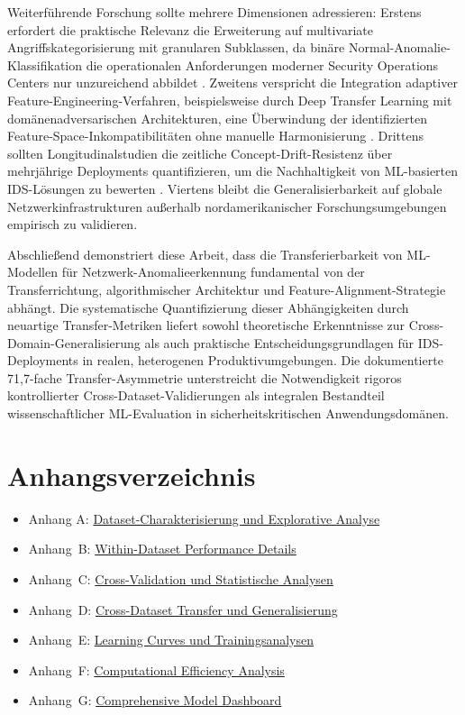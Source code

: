 \documentclass[11pt,a4paper]{article}
\newcommand{\addtoTOC}[1]{\addcontentsline{toc}{section}{#1}}
\begin{document}
    Weiterführende Forschung sollte mehrere Dimensionen adressieren: Erstens erfordert die praktische Relevanz die Erweiterung auf multivariate Angriffskategorisierung mit granularen Subklassen, da binäre Normal-Anomalie-Klassifikation die operationalen Anforderungen moderner Security Operations Centers nur unzureichend abbildet \parencite{Vinayakumar2019}. Zweitens verspricht die Integration adaptiver Feature-Engineering-Verfahren, beispielsweise durch Deep Transfer Learning mit domänenadversarischen Architekturen, eine Überwindung der identifizierten Feature-Space-Inkompatibilitäten ohne manuelle Harmonisierung \parencite{Goodfellow2016}. Drittens sollten Longitudinalstudien die zeitliche Concept-Drift-Resistenz über mehrjährige Deployments quantifizieren, um die Nachhaltigkeit von ML-basierten IDS-Lösungen zu bewerten \parencite{Ring2019}. Viertens bleibt die Generalisierbarkeit auf globale Netzwerkinfrastrukturen außerhalb nordamerikanischer Forschungsumgebungen empirisch zu validieren.

    Abschließend demonstriert diese Arbeit, dass die Transferierbarkeit von ML-Modellen für Netzwerk-Anomalieerkennung fundamental von der Transferrichtung, algorithmischer Architektur und Feature-Alignment-Strategie abhängt. Die systematische Quantifizierung dieser Abhängigkeiten durch neuartige Transfer-Metriken liefert sowohl theoretische Erkenntnisse zur Cross-Domain-Generalisierung als auch praktische Entscheidungsgrundlagen für IDS-Deployments in realen, heterogenen Produktivumgebungen. Die dokumentierte 71,7-fache Transfer-Asymmetrie unterstreicht die Notwendigkeit rigoros kontrollierter Cross-Dataset-Validierungen als integralen Bestandteil wissenschaftlicher ML-Evaluation in sicherheitskritischen Anwendungsdomänen.
    \clearpage
    \printbibliography[title={Literaturverzeichnis}]

    \clearpage
    \section*{Anhangsverzeichnis}
    \addtoTOC{Anhangsverzeichnis}
    \begin{itemize}
        \item Anhang A: \hyperref[app:dataset_analysis]{Dataset-Charakterisierung und Explorative Analyse}
        \item Anhang B: \hyperref[app:within_dataset]{Within-Dataset Performance Details}
        \item Anhang C: \hyperref[app:cross_validation]{Cross-Validation und Statistische Analysen}
        \item Anhang D: \hyperref[app:transfer_analysis]{Cross-Dataset Transfer und Generalisierung}
        \item Anhang E: \hyperref[app:learning_curves]{Learning Curves und Trainingsanalysen}
        \item Anhang F: \hyperref[app:efficiency]{Computational Efficiency Analysis}
        \item Anhang G: \hyperref[app:dashboard]{Comprehensive Model Dashboard}
    \end{itemize}
    \clearpage
\end{document}
